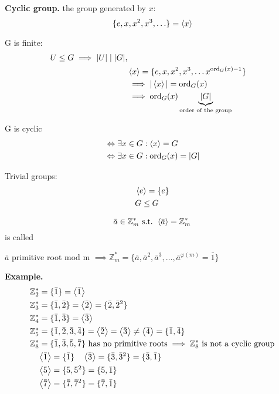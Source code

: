 \textbf{Cyclic group.}
the group generated by $x$:
\[
  \{ e, x, x^2, x^3, \ldots \} = \left\langle x \right\rangle
\]

G is finite:
\begin{align*}
  U \leq  G \implies |U| \mid |G|, \\
  & \left\langle x \right\rangle = \{ e, x, x^2, x^3, \ldots x^{\operatorname{ord}_G(x) -1}\} \\
    &\implies |\left\langle x \right\rangle| = \operatorname{ord}_G(x) \\
    &\implies \operatorname{ord}_G(x) \underbrace{|G|}_{\text{order of the group}} \\
\end{align*}

G is cyclic
\begin{align*}
  & \Leftrightarrow \exists x \in G: \left\langle x \right\rangle = G \\
  & \Leftrightarrow \exists x \in G: \operatorname{ord}_G(x) = |G|
\end{align*}

Trivial groups:
\begin{align*}
  & \left\langle e \right\rangle = \{e\} \\
  & G \leq G
\end{align*}

\begin{definition}
  \[
    \bar{a} \in \mathbb{Z}_m^{*} \text{ s.t. } \left\langle \bar{a} \right\rangle = \mathbb{Z}_m^{*} 
\]
is called 

$\bar{a}$ primitive root mod m 
$\implies \mathbb{Z}_m^{*} = \{\bar{a}, \bar{a}^2, \bar{a}^3, \ldots, \bar{a}^{\varphi(m)} =\bar{1} \}$
\end{definition}

\textbf{Example.}
\begin{align*}
  &\mathbb{Z}_2^{*} = \{\bar{1}\} = \left\langle \bar{1} \right\rangle \\
  &\mathbb{Z}_3^{*} = \{\bar{1}, \bar{2}\} = \left\langle \bar{2} \right\rangle 
    = \{\bar{2}, \bar{2}^2 \}\\
  &\mathbb{Z}_4^{*} = \{\bar{1}, \bar{3}\} = \left\langle \bar{3} \right\rangle \\
  &\mathbb{Z}_5^{*} = \{\bar{1}, \bar{2}, \bar{3}, \bar{4}\} 
    = \left\langle \bar{2} \right\rangle = \left\langle \bar{3} \right\rangle \neq \left\langle \bar{4} \right\rangle
    = \{\bar{1}, \bar{4}\} \\
  &\mathbb{Z}_8^{*} = \{\bar{1}, \bar{3}, \bar{5}, \bar{7}\} \text{ has no primitive roots} \implies \mathbb{Z}_8^{*}\text{ is not a cyclic group} \\
  & \quad \left\langle \bar{1} \right\rangle = \{\bar{1}\} \quad \left\langle \bar{3} \right\rangle=\{\bar{3}, \bar{3}^2\}=\{\bar{3}, \bar{1}\} \\
  & \quad \left\langle \bar{5} \right\rangle=\{\bar{5}, \bar{5}^2\}=\{\bar{5}, \bar{1}\} \\
  & \quad \left\langle \bar{7} \right\rangle=\{\bar{7}, \bar{7}^2\}=\{\bar{7}, \bar{1}\} \\
\end{align*}

